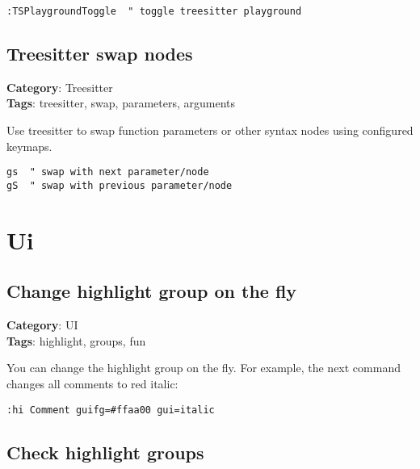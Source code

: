 {{{{{{{{{{{{{{{{{{{\begin{Exa*}{}
\begin{Verbatim}[fontsize=\footnotesize, breaklines, breakanywhere]
:TSPlaygroundToggle  " toggle treesitter playground
\end{Verbatim}
\end{Exa*}

\section{Treesitter swap nodes}

\textbf{Category}: Treesitter\\ \textbf{Tags}: treesitter, swap, parameters, arguments
\vspace{0.5cm}

Use treesitter to swap function parameters or other syntax nodes using configured keymaps.

\begin{Exa*}{}
\begin{Verbatim}[fontsize=\footnotesize, breaklines, breakanywhere]
gs  " swap with next parameter/node
gS  " swap with previous parameter/node
\end{Verbatim}
\end{Exa*}

\chapter{Ui}
\section{Change highlight group on the fly}

\textbf{Category}: UI\\ \textbf{Tags}: highlight, groups, fun
\vspace{0.5cm}

You can change the highlight group on the fly. For example, the next command changes all comments to red italic:

\begin{Exa*}{}
\begin{Verbatim}[fontsize=\footnotesize, breaklines, breakanywhere]
:hi Comment guifg=#ffaa00 gui=italic
\end{Verbatim}
\end{Exa*}

\section{Check highlight groups}

}}}}}}}}}}}}}}}}}}}
